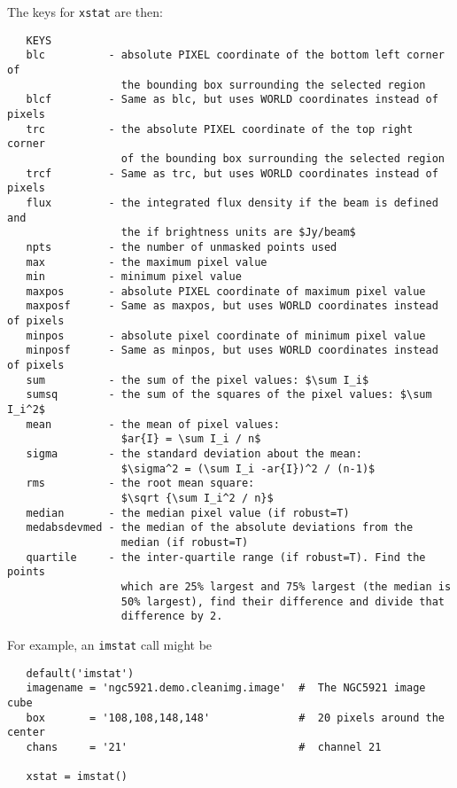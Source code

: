 The keys for {\tt xstat} are then:
\small
\begin{verbatim}
   KEYS
   blc          - absolute PIXEL coordinate of the bottom left corner of 
                  the bounding box surrounding the selected region
   blcf         - Same as blc, but uses WORLD coordinates instead of pixels
   trc          - the absolute PIXEL coordinate of the top right corner 
                  of the bounding box surrounding the selected region
   trcf         - Same as trc, but uses WORLD coordinates instead of pixels
   flux         - the integrated flux density if the beam is defined and 
                  the if brightness units are $Jy/beam$
   npts         - the number of unmasked points used
   max          - the maximum pixel value
   min          - minimum pixel value
   maxpos       - absolute PIXEL coordinate of maximum pixel value
   maxposf      - Same as maxpos, but uses WORLD coordinates instead of pixels
   minpos       - absolute pixel coordinate of minimum pixel value
   minposf      - Same as minpos, but uses WORLD coordinates instead of pixels
   sum          - the sum of the pixel values: $\sum I_i$
   sumsq        - the sum of the squares of the pixel values: $\sum I_i^2$
   mean         - the mean of pixel values: 
                  $ar{I} = \sum I_i / n$
   sigma        - the standard deviation about the mean: 
                  $\sigma^2 = (\sum I_i -ar{I})^2 / (n-1)$
   rms          - the root mean square: 
                  $\sqrt {\sum I_i^2 / n}$
   median       - the median pixel value (if robust=T)
   medabsdevmed - the median of the absolute deviations from the 
                  median (if robust=T)    
   quartile     - the inter-quartile range (if robust=T). Find the points 
                  which are 25% largest and 75% largest (the median is 
                  50% largest), find their difference and divide that 
                  difference by 2.
\end{verbatim}
\normalsize

For example, an {\tt imstat} call might be
\small
\begin{verbatim}
   default('imstat')
   imagename = 'ngc5921.demo.cleanimg.image'  #  The NGC5921 image cube
   box       = '108,108,148,148'              #  20 pixels around the center
   chans     = '21'                           #  channel 21

   xstat = imstat()
\end{verbatim}
\normalsize

